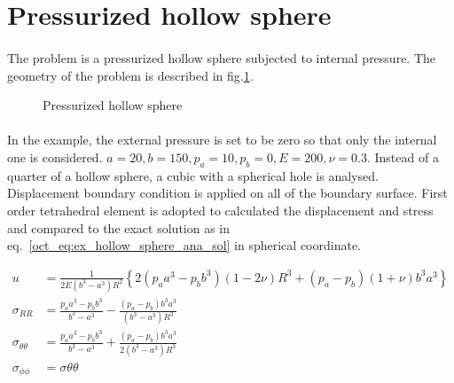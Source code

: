 \section{Pressurized hollow sphere}
\paragraph{}
The problem is a pressurized hollow sphere subjected to internal pressure. The geometry of the problem is described in fig.\ref{oct_fig:ex_pre-hollow-sphere}. 

\begin{figure}[h!]
  \centering
  \caption{Pressurized hollow sphere}
  \label{oct_fig:ex_pre-hollow-sphere}
\end{figure}

\paragraph{}
In the example, the external pressure is set to be zero so that only the internal one is considered. $a=20, b=150, p_a = 10,p_b = 0, E=200,\nu=0.3$. Instead of a quarter of a hollow sphere, a cubic with a spherical hole is analysed. Displacement boundary condition is applied on all of the boundary surface. First order tetrahedral element is adopted to calculated the displacement and stress and compared to the exact solution as in eq.~\ref{oct_eq:ex_hollow_sphere_ana_sol} in spherical coordinate.

\begin{subequations}
\begin{align}
  u & = \frac{1}{2E(b^3-a^3)R^2}\left\{ 2(p_aa^3-p_bb^3)(1-2\nu)R^3+(p_a-p_b)(1+\nu)b^3a^3\right\}\\
  \sigma_{RR} & = \frac{p_aa^3-p_bb^3}{b^3-a^3} - \frac{(p_a-p_b)b^3a^3}{(b^3-a^3)R^3}\\
  \sigma_{\theta\theta} & = \frac{p_aa^3-p_bb^3}{b^3-a^3} + \frac{(p_a-p_b)b^3a^3}{2(b^3-a^3)R^3}\\
  \sigma_{\phi\phi} & = \sigma{\theta\theta}
  \label{oct_eq:ex_hollow_sphere_ana_sol}
\end{align}
\end{subequations}


